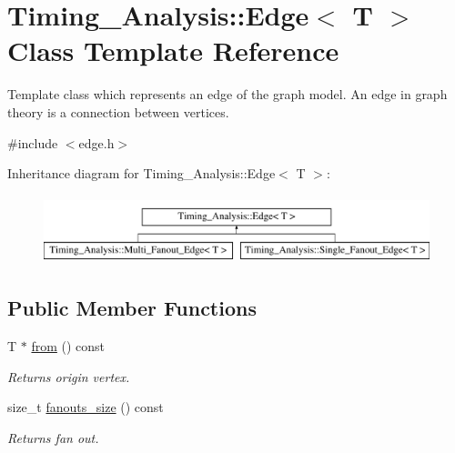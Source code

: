 \hypertarget{classTiming__Analysis_1_1Edge}{\section{Timing\-\_\-\-Analysis\-:\-:Edge$<$ T $>$ Class Template Reference}
\label{classTiming__Analysis_1_1Edge}
}


Template class which represents an edge of the graph model. An edge in graph theory is a connection between vertices.  




{\ttfamily \#include $<$edge.\-h$>$}

Inheritance diagram for Timing\-\_\-\-Analysis\-:\-:Edge$<$ T $>$\-:\begin{figure}[H]
\begin{center}
\leavevmode
\includegraphics[height=2.000000cm]{classTiming__Analysis_1_1Edge}
\end{center}
\end{figure}
\subsection*{Public Member Functions}
\begin{DoxyCompactItemize}
\item 
T $\ast$ \hyperlink{classTiming__Analysis_1_1Edge_a47020ea89fd9fde438adc814a731a23d}{from} () const 
\begin{DoxyCompactList}\small\item\em Returns origin vertex. \end{DoxyCompactList}\item 
size\-\_\-t \hyperlink{classTiming__Analysis_1_1Edge_a60c70172e973450774a8ec5d4dadbcb5}{fanouts\-\_\-size} () const 
\begin{DoxyCompactList}\small\item\em Returns fan out. \end{DoxyCompactList}\end{DoxyCompactItemize}
